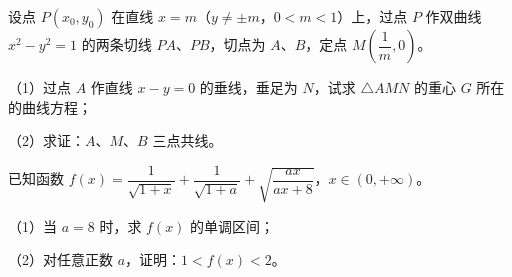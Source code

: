 \begin{question}
设点 $P(x_0,y_0)$ 在直线 $x=m$（$y\neq\pm m$，$0<m<1$）上，过点 $P$ 作双曲线 $x^2-y^2=1$ 的两条切线 $PA$、$PB$，切点为 $A$、$B$，定点 $M\left(\dfrac1m,0\right)$。

（1）过点 $A$ 作直线 $x-y=0$ 的垂线，垂足为 $N$，试求 $\triangle AMN$ 的重心 $G$ 所在的曲线方程；

（2）求证：$A$、$M$、$B$ 三点共线。
\nopagebreak[4]
\begin{center}\end{center}
\nopagebreak[4]
\end{question}
\begin{question}
已知函数 $f(x)=\dfrac1{\sqrt{1+x}}+\dfrac1{\sqrt{1+a}}+\sqrt{\dfrac{ax}{ax+8}}$，$x\in(0,+\infty)$。

（1）当 $a=8$ 时，求 $f(x)$ 的单调区间；

（2）对任意正数 $a$，证明：$1<f(x)<2$。

\end{question}